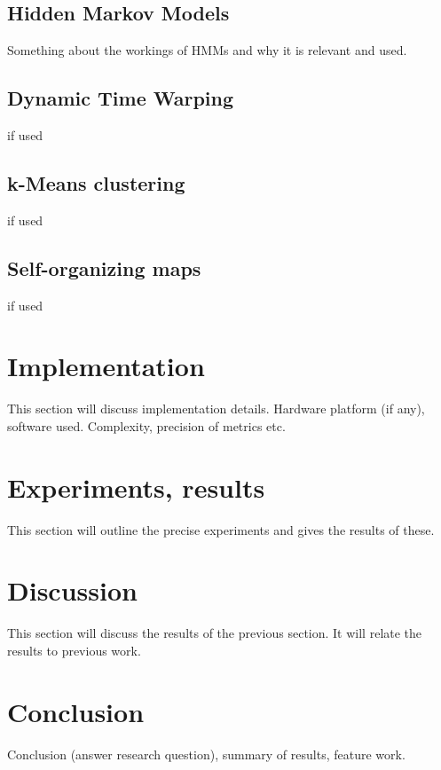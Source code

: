 \documentclass[a4paper,10pt]{extarticle}
\begin{document}
  \subsection{Hidden Markov Models}
  Something about the workings of HMMs and why it is relevant and used.

  \subsection{Dynamic Time Warping}
  if used

  \subsection{k-Means clustering}
  if used

  \subsection{Self-organizing maps}
  if used


\section{Implementation}
This section will discuss implementation details.
Hardware platform (if any), software used. Complexity, precision of metrics etc.

\section{Experiments, results}
This section will outline the precise experiments and gives the results of these.

\section{Discussion}
This section will discuss the results of the previous section.
It will relate the results to previous work.

\section{Conclusion}
Conclusion (answer research question), summary of results, feature work.
\end{document}
